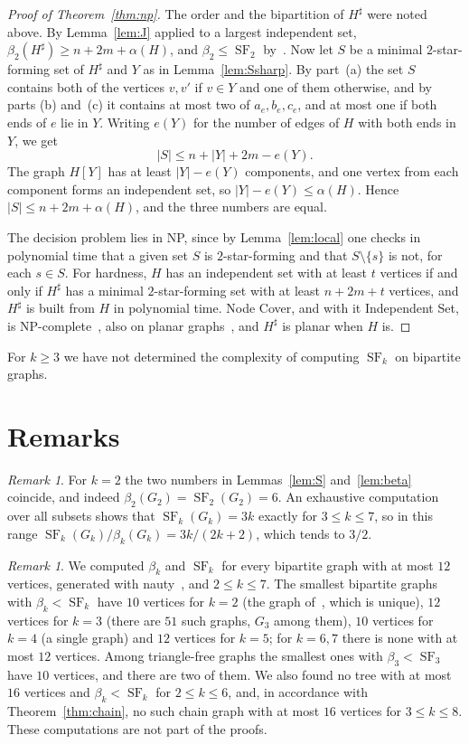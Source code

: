\documentclass[11pt]{amsart}
\theoremstyle{definition}
\theoremstyle{remark}
\newtheorem{remark}[theorem]{Remark}
\newcommand{\SF}{\operatorname{SF}}
\begin{document}
\begin{proof}[Proof of Theorem~\ref{thm:np}]
The order and the bipartition of $H^\sharp$ were noted above. By Lemma~\ref{lem:J} applied to a largest independent set, $\beta_2(H^\sharp)\ge n+2m+\alpha(H)$, and $\beta_2\le\SF_2$ by~\cite{CF}. Now let $S$ be a minimal $2$-star-forming set of $H^\sharp$ and $Y$ as in Lemma~\ref{lem:Ssharp}. By part~(a) the set $S$ contains both of the vertices $v,v'$ if $v\in Y$ and one of them otherwise, and by parts (b) and~(c) it contains at most two of $a_e,b_e,c_e$, and at most one if both ends of $e$ lie in $Y$. Writing $e(Y)$ for the number of edges of $H$ with both ends in $Y$, we get
\[
|S|\le n+|Y|+2m-e(Y).
\]
The graph $H[Y]$ has at least $|Y|-e(Y)$ components, and one vertex from each component forms an independent set, so $|Y|-e(Y)\le\alpha(H)$. Hence $|S|\le n+2m+\alpha(H)$, and the three numbers are equal.

The decision problem lies in NP, since by Lemma~\ref{lem:local} one checks in polynomial time that a given set $S$ is $2$-star-forming and that $S\setminus\{s\}$ is not, for each $s\in S$. For hardness, $H$ has an independent set with at least $t$ vertices if and only if $H^\sharp$ has a minimal $2$-star-forming set with at least $n+2m+t$ vertices, and $H^\sharp$ is built from $H$ in polynomial time. Node Cover, and with it Independent Set, is NP-complete~\cite{Ka}, also on planar graphs~\cite{GJS}, and $H^\sharp$ is planar when $H$ is.
\end{proof}

For $k\ge3$ we have not determined the complexity of computing $\SF_k$ on bipartite graphs.

\section{Remarks}

\begin{remark}
For $k=2$ the two numbers in Lemmas~\ref{lem:S} and~\ref{lem:beta} coincide, and indeed $\beta_2(G_2)=\SF_2(G_2)=6$. An exhaustive computation over all subsets shows that $\SF_k(G_k)=3k$ exactly for $3\le k\le7$, so in this range $\SF_k(G_k)/\beta_k(G_k)=3k/(2k+2)$, which tends to $3/2$.
\end{remark}

\begin{remark}\label{rem:small}
We computed $\beta_k$ and $\SF_k$ for every bipartite graph with at most $12$ vertices, generated with nauty~\cite{MP}, and $2\le k\le7$. The smallest bipartite graphs with $\beta_k<\SF_k$ have $10$ vertices for $k=2$ (the graph of~\cite{OR}, which is unique), $12$ vertices for $k=3$ (there are $51$ such graphs, $G_3$ among them), $10$ vertices for $k=4$ (a single graph) and $12$ vertices for $k=5$; for $k=6,7$ there is none with at most $12$ vertices. Among triangle-free graphs the smallest ones with $\beta_3<\SF_3$ have $10$ vertices, and there are two of them. We also found no tree with at most $16$ vertices and $\beta_k<\SF_k$ for $2\le k\le6$, and, in accordance with Theorem~\ref{thm:chain}, no such chain graph with at most $16$ vertices for $3\le k\le8$. These computations are not part of the proofs.
\end{remark}
\end{document}
